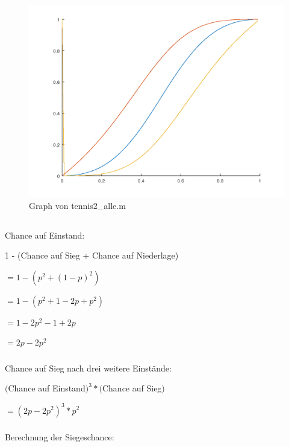 \documentclass{article}
\begin{document}
\begin{figure}[h!]
\centering
\includegraphics[scale=0.4]{graph2.png}
\caption{Graph von tennis2\_alle.m}
\label{fig:universe}
\end{figure}

\subsection{}

\subsubsection{}
Chance auf Einstand:

1 - (Chance auf Sieg + Chance auf Niederlage)

$= 1 - (p^2 + (1-p)^2)$

$= 1 - (p^2 + 1 - 2p + p^2)$

$= 1 - 2p^2 - 1 + 2p$

$= 2p - 2p^2$

\subsubsection{}
Chance auf Sieg nach drei weitere Einstände:

$($Chance auf Einstand$)^3 * ($Chance auf Sieg$)$

$= (2p - 2p^2)^3 * p^2$

\subsubsection{}
Berechnung der Siegeschance:
\end{document}
